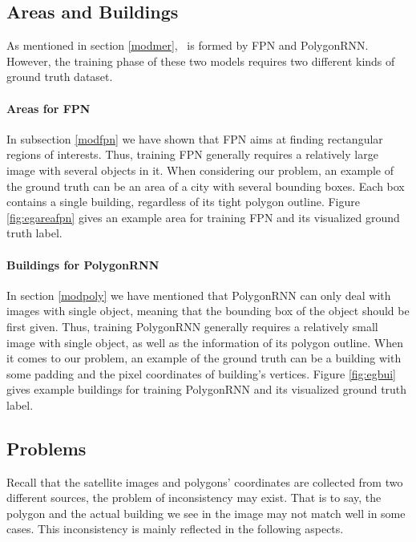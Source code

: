 \subsection{Areas and Buildings}\label{arebui}

As mentioned in section \ref{modmer}, \modelnameshort\ is formed by FPN and PolygonRNN. However, the training phase of these two models requires two different kinds of ground truth dataset.

\paragraph{Areas for FPN}
In subsection \ref{modfpn} we have shown that FPN aims at finding rectangular regions of interests. Thus, training FPN generally requires a relatively large image with several objects in it. When considering our problem, an example of the ground truth can be an area of a city with several bounding boxes. Each box contains a single building, regardless of its tight polygon outline. Figure \ref{fig:egareafpn} gives an example area for training FPN and its visualized ground truth label.



\paragraph{Buildings for PolygonRNN}
In section \ref{modpoly} we have mentioned that PolygonRNN can only deal with images with single object, meaning that the bounding box of the object should be first given. Thus, training PolygonRNN generally requires a relatively small image with single object, as well as the information of its polygon outline. When it comes to our problem, an example of the ground truth can be a building with some padding and the pixel coordinates of building's vertices. Figure \ref{fig:egbui} gives example buildings for training PolygonRNN and its visualized ground truth label.



\subsection{Problems}\label{proble}

Recall that the satellite images and polygons' coordinates are collected from two different sources, the problem of inconsistency may exist. That is to say, the polygon and the actual building we see in the image may not match well in some cases. This inconsistency is mainly reflected in the following aspects.

